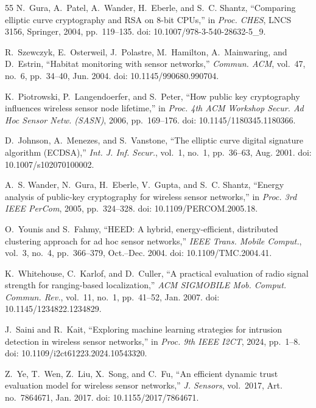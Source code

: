 \documentclass[conference]{IEEEtran}
\begin{document}
\begin{thebibliography}{55}
N.~Gura, A.~Patel, A.~Wander, H.~Eberle, and S.~C. Shantz, ``Comparing elliptic curve cryptography and RSA on 8-bit CPUs,'' in \textit{Proc. CHES}, LNCS 3156, Springer, 2004, pp.~119--135. doi: 10.1007/978-3-540-28632-5\_9.

R.~Szewczyk, E.~Osterweil, J.~Polastre, M.~Hamilton, A.~Mainwaring, and D.~Estrin, ``Habitat monitoring with sensor networks,'' \textit{Commun. ACM}, vol.~47, no.~6, pp.~34--40, Jun. 2004. doi: 10.1145/990680.990704.

K.~Piotrowski, P.~Langendoerfer, and S.~Peter, ``How public key cryptography influences wireless sensor node lifetime,'' in \textit{Proc. 4th ACM Workshop Secur. Ad Hoc Sensor Netw. (SASN)}, 2006, pp.~169--176. doi: 10.1145/1180345.1180366.

D.~Johnson, A.~Menezes, and S.~Vanstone, ``The elliptic curve digital signature algorithm (ECDSA),'' \textit{Int. J. Inf. Secur.}, vol.~1, no.~1, pp.~36--63, Aug. 2001. doi: 10.1007/s102070100002.

A.~S. Wander, N.~Gura, H.~Eberle, V.~Gupta, and S.~C. Shantz, ``Energy analysis of public-key cryptography for wireless sensor networks,'' in \textit{Proc. 3rd IEEE PerCom}, 2005, pp.~324--328. doi: 10.1109/PERCOM.2005.18.

O.~Younis and S.~Fahmy, ``HEED: A hybrid, energy-efficient, distributed clustering approach for ad hoc sensor networks,'' \textit{IEEE Trans. Mobile Comput.}, vol.~3, no.~4, pp.~366--379, Oct.--Dec. 2004. doi: 10.1109/TMC.2004.41.

K.~Whitehouse, C.~Karlof, and D.~Culler, ``A practical evaluation of radio signal strength for ranging-based localization,'' \textit{ACM SIGMOBILE Mob. Comput. Commun. Rev.}, vol.~11, no.~1, pp.~41--52, Jan. 2007. doi: 10.1145/1234822.1234829.

J.~Saini and R.~Kait, ``Exploring machine learning strategies for intrusion detection in wireless sensor networks,'' in \textit{Proc. 9th IEEE I2CT}, 2024, pp.~1--8. doi: 10.1109/i2ct61223.2024.10543320.

Z.~Ye, T.~Wen, Z.~Liu, X.~Song, and C.~Fu, ``An efficient dynamic trust evaluation model for wireless sensor networks,'' \textit{J. Sensors}, vol.~2017, Art. no.~7864671, Jan. 2017. doi: 10.1155/2017/7864671.


\end{thebibliography}
\end{document}
